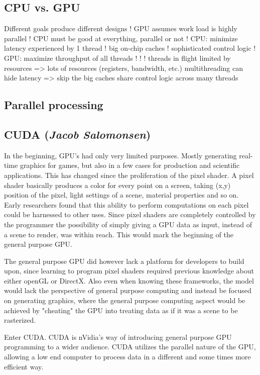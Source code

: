 \subsection{CPU vs. GPU}
  Different goals produce different designs !   GPU assumes work load is highly parallel !   CPU must be good at everything, parallel or not
!   CPU: minimize latency experienced by 1 thread !   big on-chip caches !   sophisticated control logic
!   GPU: maximize throughput of all threads
!  
!   !  
threads in flight limited by resources => lots of resources (registers, bandwidth, etc.)
multithreading can hide latency => skip the big caches share control logic across many threads

\subsection{Parallel processing}

\subsection{CUDA (\textit{Jacob Salomonsen})}
In the beginning, GPU's had only very limited purposes. Mostly generating real-time graphics for games, but also in a few cases for production and scientific applications. This has changed since the proliferation of the pixel shader. A pixel shader basically produces a color for every point on a screen, taking (x,y) position of the pixel, light settings of a scene, material properties and so on. Early researchers found that this ability to perform computations on each pixel could be harnessed to other uses. Since pixel shaders are completely controlled by the programmer the possibility of simply giving a GPU data as input, instead of a scene to render, was within reach. This would mark the beginning of the general purpose GPU.

The general purpose GPU did however lack a platform for developers to build upon, since learning to program pixel shaders required previous knowledge about either openGL or DirectX. Also even when knowing these frameworks, the model would lack the perspective of general purpose computing and instead be focused on generating graphics, where the general purpose computing aspect would be achieved by "cheating" the GPU into treating data as if it was a scene to be rasterized.

Enter CUDA. CUDA is nVidia's way of introducing general purpose GPU programming to a wider audience. CUDA utilizes the parallel nature of the GPU, allowing a low end computer to process data in a different and some times more efficient way.

